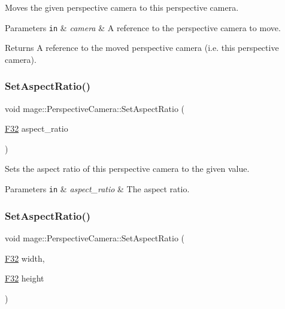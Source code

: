 Moves the given perspective camera to this perspective camera.


\begin{DoxyParams}[1]{Parameters}
\mbox{\tt in}  & {\em camera} & A reference to the perspective camera to move. \\
\hline
\end{DoxyParams}
\begin{DoxyReturn}{Returns}
A reference to the moved perspective camera (i.\+e. this perspective camera). 
\end{DoxyReturn}
\hypertarget{classmage_1_1_perspective_camera_a60fda2d54481a0f4c04fe8a08a8d729b}{}\label{classmage_1_1_perspective_camera_a60fda2d54481a0f4c04fe8a08a8d729b} 
\subsubsection{\texorpdfstring{Set\+Aspect\+Ratio()}{SetAspectRatio()}\hspace{0.1cm}{\footnotesize\ttfamily [1/2]}}
{\footnotesize\ttfamily void mage\+::\+Perspective\+Camera\+::\+Set\+Aspect\+Ratio (\begin{DoxyParamCaption}\item[{\hyperlink{namespacemage_aa97e833b45f06d60a0a9c4fc22ae02c0}{F32}}]{aspect\+\_\+ratio }\end{DoxyParamCaption})\hspace{0.3cm}{\ttfamily [noexcept]}}

Sets the aspect ratio of this perspective camera to the given value.


\begin{DoxyParams}[1]{Parameters}
\mbox{\tt in}  & {\em aspect\+\_\+ratio} & The aspect ratio. \\
\hline
\end{DoxyParams}
\hypertarget{classmage_1_1_perspective_camera_ab54d9fe7a52955201d37af521c9e9727}{}\label{classmage_1_1_perspective_camera_ab54d9fe7a52955201d37af521c9e9727} 
\subsubsection{\texorpdfstring{Set\+Aspect\+Ratio()}{SetAspectRatio()}\hspace{0.1cm}{\footnotesize\ttfamily [2/2]}}
{\footnotesize\ttfamily void mage\+::\+Perspective\+Camera\+::\+Set\+Aspect\+Ratio (\begin{DoxyParamCaption}\item[{\hyperlink{namespacemage_aa97e833b45f06d60a0a9c4fc22ae02c0}{F32}}]{width,  }\item[{\hyperlink{namespacemage_aa97e833b45f06d60a0a9c4fc22ae02c0}{F32}}]{height }\end{DoxyParamCaption})\hspace{0.3cm}{\ttfamily [noexcept]}}

